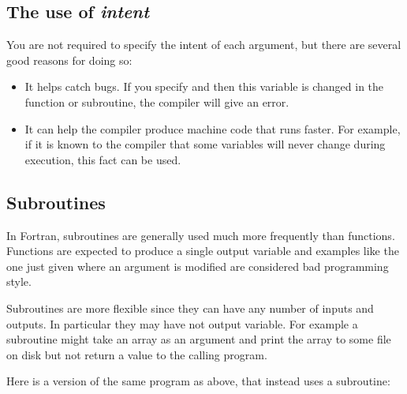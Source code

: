 \documentclass[letterpaper,10pt,english]{sphinxmanual}
\begin{document}
\subsection{The use of \emph{intent}}
\label{fortran_sub:the-use-of-intent}
You are not required to specify the intent of each argument, but there are
several good reasons for doing so:
\begin{itemize}
\item {} 
It helps catch bugs.  If you specify  and then this variable
is changed in the function or subroutine, the compiler will give an
error.

\item {} 
It can help the compiler produce machine code that runs faster.  For
example, if it
is known to the compiler that some variables will never change during
execution, this fact can be used.

\end{itemize}


\subsection{Subroutines}
\label{fortran_sub:subroutines}
In Fortran, subroutines are generally used much more frequently than
functions.  Functions are expected to produce a single output variable and
examples like the one just given where an argument is modified are considered
bad programming style.

Subroutines are more flexible since they can have any number of inputs and
outputs.  In particular they may have not output variable.  For example a
subroutine might take an array as an argument and print the array to some
file on disk but not return a value to the calling program.

Here is a version of the same program  as  above,
that instead uses a subroutine:
\end{document}
